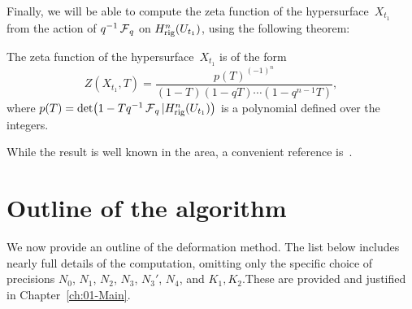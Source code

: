 Finally, we will be able to compute the zeta function of the 
hypersurface~$X_{t_1}$ from the action of $q^{-1} \operatorname{\mathcal{F}}_q$ on 
$H_{\text{rig}}^{n}(U_{t_1})$, using the following theorem:

\begin{thm}
The zeta function of the hypersurface~$X_{t_1}$ is of the form
\begin{equation*}
Z(X_{t_1},T) = \frac{p(T)^{(-1)^n}}{(1 - T) (1 - qT) \dotsm (1 - q^{n-1}T)},
\end{equation*}
where $p(T) = \det \bigl( 1 - T q^{-1} \operatorname{\mathcal{F}}_q | H_{\text{rig}}^n(U_{t_1}) \bigr)$ 
is a polynomial defined over the integers.
\end{thm}

While the result is well known in the area, a convenient reference 
is~\citep[Theorem~3.1]{Gerkmann2007}.


\section{Outline of the algorithm}

We now provide an outline of the deformation method.  The list below 
includes nearly full details of the computation, omitting only the 
specific choice of precisions $N_0$, $N_1$, $N_2$, $N_3$, $N_3'$, $N_4$, 
and $K_1, K_2$.These are provided and justified in Chapter~\ref{ch:01-Main}.

